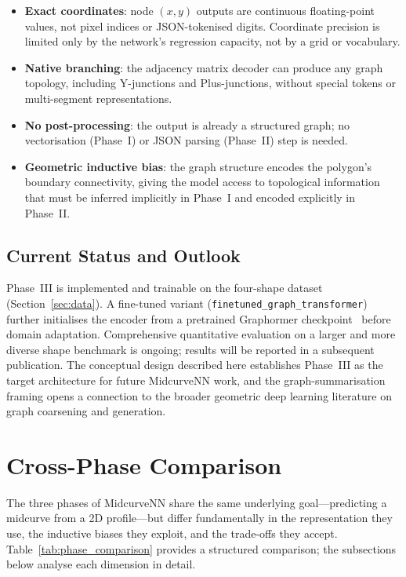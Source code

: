 \documentclass[journal]{IEEEtran}
\begin{document}
\begin{itemize}
  \item \textbf{Exact coordinates}: node $(x, y)$ outputs are continuous
        floating-point values, not pixel indices or JSON-tokenised digits.
        Coordinate precision is limited only by the network's regression
        capacity, not by a grid or vocabulary.
  \item \textbf{Native branching}: the adjacency matrix decoder can produce
        any graph topology, including Y-junctions and Plus-junctions, without
        special tokens or multi-segment representations.
  \item \textbf{No post-processing}: the output is already a structured graph;
        no vectorisation (Phase~I) or JSON parsing (Phase~II) step is needed.
  \item \textbf{Geometric inductive bias}: the graph structure encodes the
        polygon's boundary connectivity, giving the model access to topological
        information that must be inferred implicitly in Phase~I and encoded
        explicitly in Phase~II.
\end{itemize}

\subsection{Current Status and Outlook}

Phase~III is implemented and trainable on the four-shape dataset
(Section~\ref{sec:data}).  A fine-tuned variant (\texttt{finetuned\_graph\_transformer})
further initialises the encoder from a pretrained Graphormer
checkpoint~\cite{ying2021transformers} before domain adaptation.  Comprehensive
quantitative evaluation on a larger and more diverse shape benchmark is ongoing;
results will be reported in a subsequent publication.  The conceptual design
described here establishes Phase~III as the target architecture for future
MidcurveNN work, and the graph-summarisation framing opens a connection to the
broader geometric deep learning literature on graph coarsening and generation.

\section{Cross-Phase Comparison}
\label{sec:comparison}

The three phases of MidcurveNN share the same underlying goal—predicting a
midcurve from a 2D profile—but differ fundamentally in the representation they
use, the inductive biases they exploit, and the trade-offs they accept.
Table~\ref{tab:phase_comparison} provides a structured comparison; the
subsections below analyse each dimension in detail.
\end{document}
